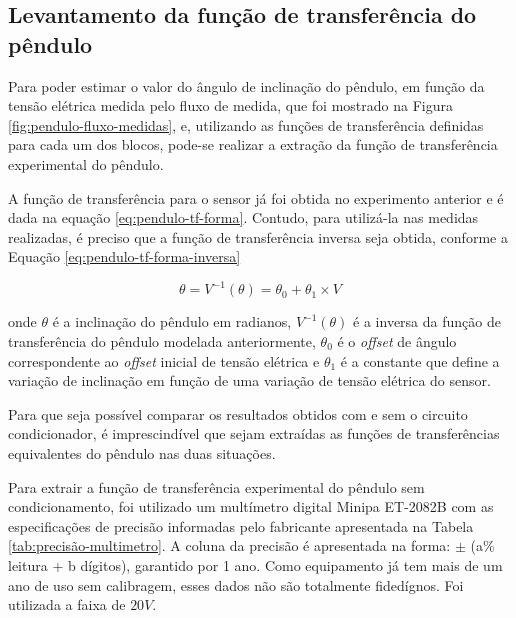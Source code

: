 \documentclass[a4paper]{instrumentacao}
\begin{document}
\subsection{Levantamento da função de transferência do pêndulo}
\label{sec:tf-pedulo}

Para poder estimar o valor do ângulo de inclinação do pêndulo, em função da tensão elétrica medida pelo fluxo de medida, que foi mostrado na Figura \ref{fig:pendulo-fluxo-medidas}, e, utilizando as funções de transferência definidas para cada um dos blocos, pode-se realizar a extração da função de transferência experimental do pêndulo.

A função de transferência para o sensor já foi obtida no experimento anterior e é dada na equação \ref{eq:pendulo-tf-forma}. Contudo, para utilizá-la nas medidas realizadas, é preciso que a função de transferência inversa seja obtida, conforme a Equação \ref{eq:pendulo-tf-forma-inversa}

\begin{equation}
	\theta = V^{-1}(\theta) = \theta_0 + \theta_1 \times V
	\label{eq:pendulo-tf-forma-inversa}
\end{equation}

onde $\theta$ é a inclinação do pêndulo em radianos, $V^{-1}(\theta)$ é a inversa da função de transferência do pêndulo modelada anteriormente, $\theta_0$ é o \textit{offset} de ângulo correspondente ao \textit{offset} inicial de tensão elétrica e $\theta_1$ é a constante que define a variação de inclinação em função de uma variação de tensão elétrica do sensor.

Para que seja possível comparar os resultados obtidos com e sem o circuito condicionador, é imprescindível que sejam extraídas as funções de transferências equivalentes do pêndulo nas duas situações.

Para extrair a função de transferência experimental do pêndulo sem condicionamento, foi utilizado um multímetro digital Minipa ET-2082B com as especificações de precisão informadas pelo fabricante apresentada na Tabela \ref{tab:precisão-multimetro}. A coluna da precisão é apresentada na forma: $\pm$ (a$\%$ leitura + b dígitos), garantido por 1 ano. Como equipamento já tem mais de um ano de uso sem calibragem, esses dados não são totalmente fidedígnos. Foi utilizada a faixa de $20 V$.
\end{document}
